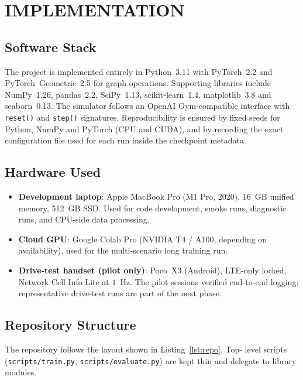 \documentclass[12pt,a4paper,oneside]{report}
\begin{document}
\chapter{IMPLEMENTATION}

\section{Software Stack}

The project is implemented entirely in Python~3.11 with PyTorch~2.2 and
PyTorch~Geometric~2.5 for graph operations. Supporting libraries include
NumPy~1.26, pandas~2.2, SciPy~1.13, scikit-learn~1.4, matplotlib~3.8 and
seaborn~0.13. The simulator follows an OpenAI Gym-compatible interface
with \texttt{reset()} and \texttt{step()} signatures. Reproducibility is
ensured by fixed seeds for Python, NumPy and PyTorch (CPU and CUDA),
and by recording the exact configuration file used for each run inside
the checkpoint metadata.

\section{Hardware Used}

\begin{itemize}[leftmargin=*]
    \item \textbf{Development laptop}: Apple MacBook Pro (M1 Pro, 2020),
    16~GB unified memory, 512~GB SSD. Used for code development,
    smoke runs, diagnostic runs, and CPU-side data processing.
    \item \textbf{Cloud GPU}: Google Colab Pro (NVIDIA T4 / A100,
    depending on availability), used for the multi-scenario long
    training run.
    \item \textbf{Drive-test handset (pilot only)}: Poco~X3 (Android),
    LTE-only locked, Network Cell Info Lite at $1$~Hz. The pilot
    sessions verified end-to-end logging; representative drive-test
    runs are part of the next phase.
\end{itemize}

\section{Repository Structure}

The repository follows the layout shown in Listing~\ref{lst:repo}. Top-
level scripts (\texttt{scripts/train.py}, \texttt{scripts/evaluate.py})
are kept thin and delegate to library modules.
\end{document}
